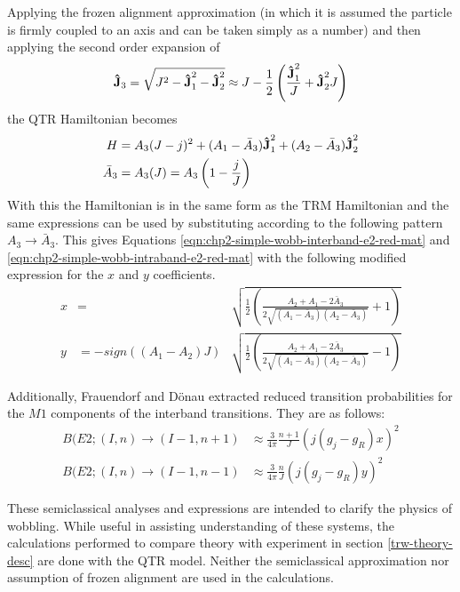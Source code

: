 Applying the frozen alignment approximation (in which it is assumed the particle is firmly coupled to an axis and can be taken simply as a number) and then applying the second order expansion of
\begin{equation}
\boldsymbol{\hat{\textbf{J}}}_3=\sqrt{J^2-\boldsymbol{\hat{\textbf{J}}}_1^2-\boldsymbol{\hat{\textbf{J}}}_2^2}\approx{}J-\frac{1}{2}\left(\frac{\boldsymbol{\hat{\textbf{J}}}_1^2}{J}+\boldsymbol{\hat{\textbf{J}}}_2^2{J}\right)
\end{equation}
the QTR Hamiltonian becomes
\begin{align}
H&=A_3(J-j)^2+(A_1-\bar{A}_3)\boldsymbol{\hat{\textbf{J}}}^2_1+(A_2-\bar{A}_3)\boldsymbol{\hat{\textbf{J}}}^2_2\\
\bar{A}_3&=A_3(J)=A_3\left(1-\frac{j}{J}\right)
\end{align}
With this the Hamiltonian is in the same form as the TRM Hamiltonian and the same expressions can be used by substituting according to the following pattern $A_3 \rightarrow\bar{A}_3$. This gives Equations \ref{eqn:chp2-simple-wobb-interband-e2-red-mat} and \ref{eqn:chp2-simple-wobb-intraband-e2-red-mat} with the following modified expression for the $x$ and $y$ coefficients.
\begin{align}
\label{eqn:chp2-simple-wobb-x-y-params-mod}
x&=&\sqrt{\frac{1}{2}\left(\frac{A_2+A_1-2\bar{A}_3}{2\sqrt{(A_1-\bar{A}_3)(A_2-\bar{A}_3)}}+1\right)}\\
y&=-sign((A_1-A_2)J)&\sqrt{\frac{1}{2}\left(\frac{A_2+A_1-2\bar{A}_3}{2\sqrt{(A_1-\bar{A}_3)(A_2-\bar{A}_3)}}-1\right)}\nonumber
\end{align}

Additionally, Frauendorf and D\"onau \cite{frauendorfTransverseWobbling} extracted reduced transition probabilities for the $M1$ components of the interband transitions. They are as follows:
\begin{align}
\label{eqn:chp2-simple-wobb-interband-m1-red-mat}
B(E2;(I,n)\rightarrow(I-1,n+1)&\approx\frac{3}{4\pi}\frac{n+1}{J}\left(j(g_j-g_R)x\right)^2\\
B(E2;(I,n)\rightarrow(I-1,n-1)&\approx\frac{3}{4\pi}\frac{n}{J}\left(j(g_j-g_R)y\right)^2
\end{align}

These semiclassical analyses and expressions are intended to clarify the physics of wobbling. While useful in assisting understanding of these systems, the calculations performed to compare theory with experiment in section \ref{trw-theory-desc} are done with the QTR model. Neither the semiclassical approximation nor assumption of frozen alignment are used in the calculations.

